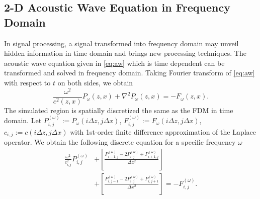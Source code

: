 \documentclass[11pt]{article}
\theoremstyle{plain}
\theoremstyle{definition}
\theoremstyle{remark}
\numberwithin{equation}{section}
\begin{document}
\subsection{2-D Acoustic Wave Equation in Frequency Domain}
In signal processing, a signal transformed into frequency domain may unveil hidden information in time domain and brings new processing
techniques. The acoustic wave equation given in \eqref{eq:aw} which is time dependent can be transformed and solved in frequency domain. 
Taking Fourier transform of \eqref{eq:aw} with respect to $t$ on both sides, we obtain
  \begin{equation}
  \frac{\omega^2}{c^2(z, x)}P_{\omega}(z, x) + \nabla^2 P_{\omega}(z, x) =- F_{\omega}(z, x).
  \end{equation}
 The simulated region is spatially discretized the same as the FDM in time domain.  
  Let $P_{i,j}^{(\omega)} := P_{\omega}(i\Delta z, j\Delta x)$, $F_{i,j}^{(\omega)} := 
  F_{\omega}(i\Delta z, j\Delta x)$, $c_{i,j} := c(i\Delta z, j\Delta x)$  with 1st-order finite difference approximation of the Laplace operator.
  We obtain the following discrete equation for a specific frequency $\omega$
  \begin{equation}
  \begin{aligned}
  \frac{\omega^2}{c_{i,j}^2} P_{i,j}^{(\omega)} &+\left[ \frac{P_{i-1,j}^{(\omega)} - 2P_{i,j}^{(\omega)} + P_{i+1,j}^{(\omega)}}{\Delta z^2} \right] \\&+\left[ \frac{P_{i,j-1}^{(\omega)} - 2P_{i,j}^{(\omega)} + P_{i,j+1}^{(\omega)}}{\Delta x^2} \right] =- F_{i,j}^{(\omega)}.
  \end{aligned}
  \end{equation}
  
\end{document}
